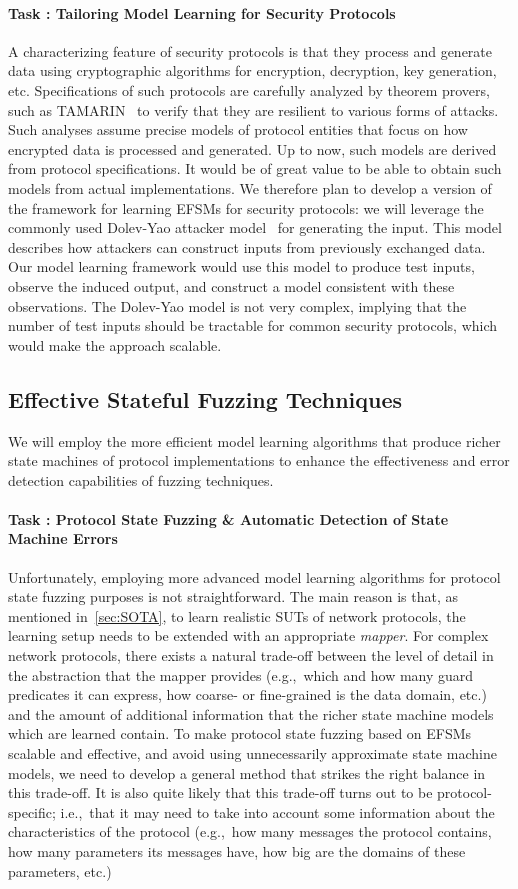\documentclass[11pt]{article}
\newcommand{\system}[1]{\mbox{\textsf{#1}}}
\newcounter{Task}
\newcommand{\task}[1]{\addtocounter{Task}{1}\paragraph{Task \theTask: #1}}
\newcommand{\significance}[1]{\vspace*{-0.5em}%
  \begin{quoting}\noindent\textbf{Significance:} #1\end{quoting}}
\newcommand{\myparagraph}{}
\let\myparagraph=\paragraph
\renewcommand{\paragraph}{\vspace{-3mm}\myparagraph}
\newcommand{\eg}{e.\/g.,\ }
\newcommand{\ie}{i.\/e.,\ }
\begin{document}
\task{Tailoring Model Learning for Security Protocols}
A characterizing feature of security protocols is that they process and generate data using cryptographic algorithms for encryption, decryption, key generation, etc. Specifications of such protocols are carefully analyzed by theorem provers, such as \system{TAMARIN}~\cite{TAMARIN@CAV-13} to verify that they are resilient to various forms of attacks. Such analyses assume precise models of protocol entities that focus on how encrypted data is processed and generated. Up to now, such models are derived from protocol specifications. It would be of great value to be able to obtain such models from actual implementations. We therefore plan to develop a version of the framework for learning EFSMs for security protocols: we
will leverage the commonly used Dolev-Yao attacker model~\cite{DolevYao83} for generating the input. This model describes how attackers can construct inputs from previously exchanged data. Our
model learning framework would use this model to produce test inputs, observe the induced output, and construct a model consistent with these observations. The Dolev-Yao model is not very complex, implying that the number of test inputs should be tractable for common security protocols, which would make the approach scalable.


\subsection{Effective Stateful Fuzzing Techniques}
We will employ the more efficient model learning algorithms that produce
richer state machines of protocol implementations to enhance the effectiveness
and error detection capabilities of fuzzing techniques.

\task{Protocol State Fuzzing \& Automatic Detection of State Machine Errors}
Unfortunately, employing more advanced model learning algorithms for protocol
state fuzzing purposes is not straightforward.  The main reason is that, as
mentioned in~\cref{sec:SOTA}, to learn realistic SUTs of network protocols,
the learning setup needs to be extended with an appropriate \emph{mapper}.
For complex network protocols, there exists a natural trade-off between the
level of detail in the abstraction that the mapper provides (\eg which and how
many guard predicates it can express, how coarse- or fine-grained is the data
domain, etc.) and the amount of additional information that the richer state
machine models which are learned contain.  To make protocol state fuzzing
based on EFSMs scalable and effective, and avoid using unnecessarily
approximate state machine models, we need to develop a general method that
strikes the right balance in this trade-off.
%
It is also quite likely that this trade-off turns out to be protocol-specific;
\ie that it may need to take into account some information about the
characteristics of the protocol (\eg how many messages the protocol contains,
how many parameters its messages have, how big are the domains of these
parameters, etc.)
\end{document}
